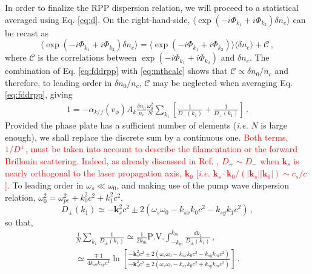\documentclass[
 reprint,
 superscriptaddress,
 amsmath,amssymb,
 aps,
]{revtex4-1}
\def\tc{\textcolor{red}}
\begin{document}
In order to finalize the RPP dispersion relation, we will proceed to a statistical averaged using Eq. \eqref{eq:d}. On the right-hand-side,  $\langle\exp(-i\Phi_{k_1}+i\Phi_{k_2})\delta n_e \rangle$ can be recast as
\begin{equation}
\langle\exp(-i\Phi_{k_1}+i\Phi_{k_2})\delta n_e \rangle= \langle\exp(-i\Phi_{k_1}+i\Phi_{k_2}) \rangle\langle\delta n_e \rangle + \mathcal{C}\, , \label{eq:mthcalc}
\end{equation}
where $\mathcal{C}$ is the correlations   between  \mbox{$\exp(-i\Phi_{k_1}+i\Phi_{k_2})$} and $\delta n_e$. The combination of Eq. \eqref{eq:fddrpp} with \eqref{eq:mthcalc} shows that $\mathcal{C}\propto \delta n_0/n_c$ and therefore, to leading order in $\delta n_0/n_c$, $\mathcal{C}$ may  be neglected when  averaging   Eq. \eqref{eq:fddrpp}, giving
\begin{align}
  1= -\alpha_{k/f}(v_\phi)A_k \frac{\delta n_0}{n_c} \frac{\omega_0^2}{N}\sum_{ k_{1} }        \left[ \frac{1 }{D_-(k_{1})} +\frac{1}{D_+(k_{1})} \right] \, .\label{eq:disperpp} 
\end{align}
Provided the phase plate has a sufficient number of elements (\emph{i.e.} $N$ is large enough), we shall replace the discrete sum by a continuous one. 
\tc{%
Both terms, $1/D^\pm$, must be taken into account to describe the filamentation or the forward Brillouin scattering. Indeed, as already discussed in Ref. %
\cite[]{POF_Drake_1973},  $D_+\sim D_-$ when $\mathbf{k}_s$ is nearly orthogonal to the laser propagation axis, $\mathbf{k}_0$  [\emph{i.e.} $\mathbf{k}_s\cdot \mathbf{k}_0/(\vert \mathbf{k}_s\vert \vert \mathbf{k}_0\vert )\sim c_s/c$].
}
To leading order 
in  $\omega_s\ll\omega_0$, and making use of the pump wave dispersion relation, $\omega_0^2=\omega_{pe}^2+k_0^2c^2+k_1^2c^2$,
\begin{equation}\label{eq:dpmk1}
D_\pm(k_1) \simeq -\mathbf{k}_s^2c^2\pm 2(\omega_s\omega_0 - k_{sx}k_0 c^2-k_{sy} k_1 c^2) \, , 
\end{equation} 
so that,
\begin{align}
 \frac{1}{N} \sum_{ k_{1} }  \frac{1 }{D_\pm(k_{1})}  \simeq \frac{1}{2k_m} \mathrm{P.V.} \int_{ -k_m }^{ k_m }       \frac{dk_1 }{D_\pm(k_{1})}  \, , \nonumber\\
 \simeq \frac{\mp\,1}{4k_mk_{sy}c^2} \ln\left[
 \frac{ -\mathbf{k}_s^2c^2\pm 2(\omega_s\omega_0 - k_{sx}k_0 c^2-k_{sy} k_m c^2)}{ -\mathbf{k}_s^2c^2\pm 2(\omega_s\omega_0 - k_{sx}k_0 c^2+k_{sy} k_m c^2)} \right] \, .\label{eq:sumint} 
\end{align}
\end{document}
